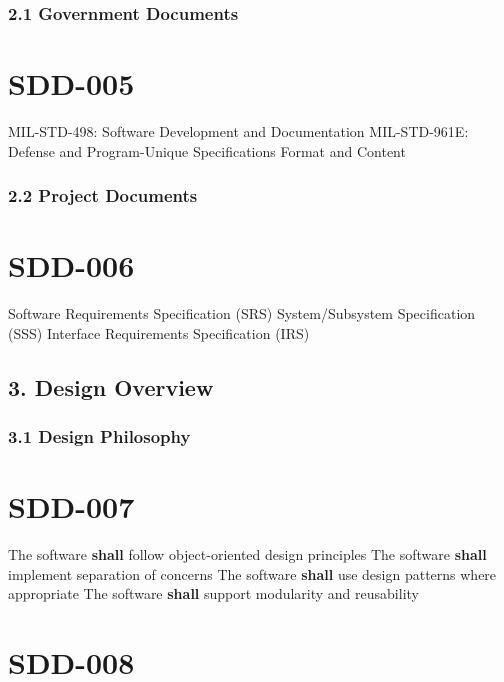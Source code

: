 \subsubsection{2.1 Government Documents}

\section{SDD-005}\label{SDD-005}

MIL-STD-498: Software Development and Documentation
MIL-STD-961E: Defense and Program-Unique Specifications Format and Content\\

\subsubsection{2.2 Project Documents}

\section{SDD-006}\label{SDD-006}

Software Requirements Specification (SRS)
System/Subsystem Specification (SSS)
Interface Requirements Specification (IRS)\\

\subsection{3. Design Overview}

\subsubsection{3.1 Design Philosophy}

\section{SDD-007}\label{SDD-007}

The software \textbf{shall} follow object-oriented design principles
The software \textbf{shall} implement separation of concerns
The software \textbf{shall} use design patterns where appropriate
The software \textbf{shall} support modularity and reusability

\section{SDD-008}\label{SDD-008}

